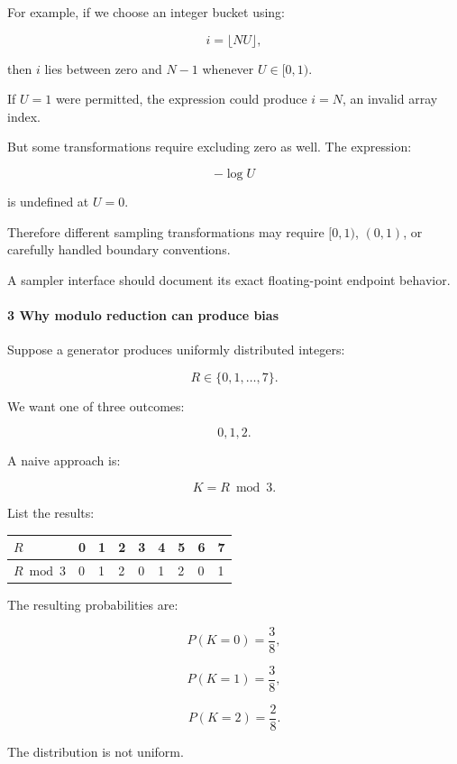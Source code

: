 For example, if we choose an integer bucket using:

\[
 i=\lfloor NU\rfloor,
\]

then \(i\) lies between zero and \(N-1\) whenever \(U\in[0,1)\).

If \(U=1\) were permitted, the expression could produce \(i=N\), an invalid array index.

But some transformations require excluding zero as well. The expression:

\[
 -\log U
\]

is undefined at \(U=0\).

Therefore different sampling transformations may require \([0,1)\), \((0,1)\), or carefully handled boundary conventions.

A sampler interface should document its exact floating-point endpoint behavior.

\paragraph{3 Why modulo reduction can produce bias}\label{02-foundations-ii-ch029-why-modulo-reduction-can-produce-bias}

\hypertarget{02-foundations-ii-ch029-why-modulo-reduction-can-produce-bias}{}

Suppose a generator produces uniformly distributed integers:

\[
 R\in\{0,1,\ldots,7\}.
\]

We want one of three outcomes:

\[
 0,1,2.
\]

A naive approach is:

\[
 K=R\bmod3.
\]

List the results:

{\def\LTcaptype{none} %
\begin{longtable}[]{@{}lllllllll@{}}
\toprule\noalign{}
\(R\) & 0 & 1 & 2 & 3 & 4 & 5 & 6 & 7 \\
\midrule\noalign{}
\endhead
\bottomrule\noalign{}
\endlastfoot
\(R\bmod3\) & 0 & 1 & 2 & 0 & 1 & 2 & 0 & 1 \\
\end{longtable}
}

The resulting probabilities are:

\[
 P(K=0)=\frac38,
\]

\[
 P(K=1)=\frac38,
\]

\[
 P(K=2)=\frac28.
\]

The distribution is not uniform.

